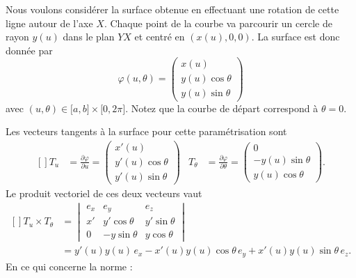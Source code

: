Nous voulons considérer la surface obtenue en effectuant une rotation de cette ligne autour de l'axe $X$. Chaque point de la courbe va parcourir un cercle de rayon $y(u)$ dans le plan $YX$ et centré en $(x(u),0,0)$. La surface est donc donnée par
\begin{equation}
    \varphi(u,\theta)=\begin{pmatrix}
        x(u)    \\
        y(u)\cos\theta    \\
        y(u)\sin\theta
    \end{pmatrix}
\end{equation}
avec $(u,\theta)\in\mathopen[ a , b \mathclose]\times \mathopen[ 0 , 2\pi \mathclose]$. Notez que la courbe de départ correspond à $\theta=0$.

Les vecteurs tangents à la surface pour cette paramétrisation sont
\begin{equation}
    \begin{aligned}[]
        T_u&=\frac{ \partial \varphi }{ \partial u }=\begin{pmatrix}
            x'(u)    \\
            y'(u)\cos\theta    \\
            y'(u)\sin\theta
        \end{pmatrix}&
        T_{\theta}&=\frac{ \partial \varphi }{ \partial \theta }=\begin{pmatrix}
            0    \\
            -y(u)\sin\theta    \\
            y(u)\cos\theta
        \end{pmatrix}.
    \end{aligned}
\end{equation}
Le produit vectoriel de ces deux vecteurs vaut
\begin{equation}
    \begin{aligned}[]
        T_u\times T_{\theta}&=\begin{vmatrix}
            e_x    &   e_y    &   e_z    \\
            x'    &   y'\cos\theta    &   y'\sin\theta    \\
            0    &   -y\sin\theta    &   y\cos\theta
        \end{vmatrix}\\
        &=y'(u)y(u)\,e_x-x'(u)y(u)\cos\theta\, e_y+x'(u)y(u)\sin\theta\, e_z.
    \end{aligned}
\end{equation}
En ce qui concerne la norme :
